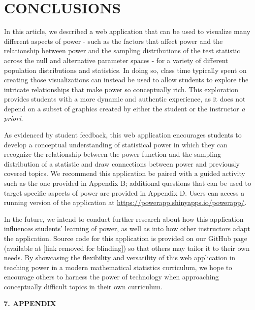 \documentclass{TISE}
\begin{document}
\section{CONCLUSIONS}

In this article, we described a web application that can be used to visualize many different aspects of power - such as the factors that affect power and the relationship between power and the sampling distributions of the test statistic across the null and alternative parameter spaces - for a variety of different population distributions and statistics. In doing so, class time typically spent on creating those visualizations can instead be used to allow students to explore the intricate relationships that make power so conceptually rich. This exploration provides students with a more dynamic and authentic experience, as it does not depend on a subset of graphics created by either the student or the instructor \textit{a priori}. 

As evidenced by student feedback, this web application encourages students to develop a conceptual understanding of statistical power in which they can recognize the relationship between the power function and the sampling distribution of a statistic and draw connections between power and previously covered topics. We recommend this application be paired with a guided activity such as the one provided in Appendix B; additional questions that can be used to target specific aspects of power are provided in Appendix D. Users can access a running version of the application at \url{https://powerapp.shinyapps.io/powerapp/}.

In the future, we intend to conduct further research about how this application influences students' learning of power, as well as into how other instructors adapt the application.  Source code for this application is provided on our GitHub page (available at [link removed for blinding]) so that others may tailor it to their own needs. By showcasing the flexibility and versatility of this web application in teaching power in a modern mathematical statistics curriculum, we hope to encourage others to harness the power of technology when approaching conceptually difficult topics in their own curriculum. 

\newpage

\renewcommand\refname{\large 6. REFERENCES}


\newpage

\begin{center}
	\textbf{\large 7. APPENDIX}
\end{center}
\end{document}
